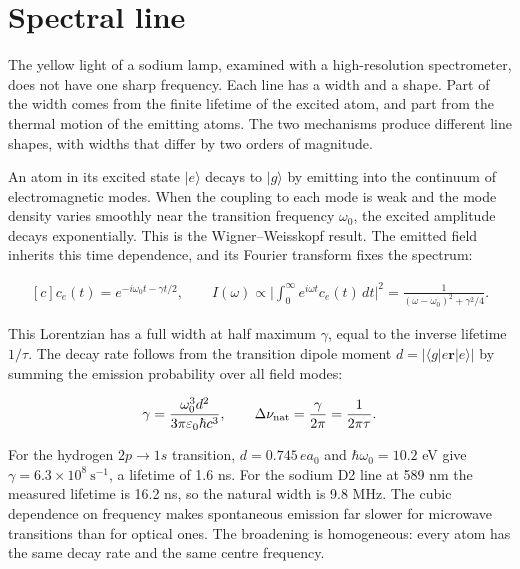 \documentclass[11pt,oneside]{book}
\newenvironment{centeredalign}{\[\begin{gathered}[c]}{\end{gathered}\]}
\newcommand{\ket}[1]{\lvert #1\rangle}
\begin{document}
\clearpage

\section{Spectral line}

\label{topic:spectral-line}

The yellow light of a sodium lamp, examined with a high-resolution spectrometer, does not have one sharp frequency. Each line has a width and a shape. Part of the width comes from the finite lifetime of the excited atom, and part from the thermal motion of the emitting atoms. The two mechanisms produce different line shapes, with widths that differ by two orders of magnitude.

An atom in its excited state \(\ket e\) decays to \(\ket g\) by emitting into the continuum of electromagnetic modes. When the coupling to each mode is weak and the mode density varies smoothly near the transition frequency \(\omega_0\), the excited amplitude decays exponentially. This is the Wigner--Weisskopf result. The emitted field inherits this time dependence, and its Fourier transform fixes the spectrum:

\begin{centeredalign}
c_e(t)=e^{-i\omega_0t-\gamma t/2},\qquad
I(\omega)\propto\Big|\int_0^\infty e^{i\omega t}c_e(t)\,dt\Big|^2=\frac{1}{(\omega-\omega_0)^2+\gamma^2/4}.
\end{centeredalign}

This Lorentzian has a full width at half maximum \(\gamma\), equal to the inverse lifetime \(1/\tau\). The decay rate follows from the transition dipole moment \(d=|\langle g|e\mathbf r|e\rangle|\) by summing the emission probability over all field modes:

\begin{centeredalign}
\gamma=\frac{\omega_0^3d^2}{3\pi\varepsilon_0\hbar c^3},\qquad
\Delta\nu_{\rm nat}=\frac{\gamma}{2\pi}=\frac{1}{2\pi\tau}.
\end{centeredalign}

For the hydrogen \(2p\to1s\) transition, \(d=0.745\,ea_0\) and \(\hbar\omega_0=10.2\) eV give \(\gamma=6.3\times10^8\ \mathrm{s}^{-1}\), a lifetime of 1.6 ns. For the sodium D2 line at 589 nm the measured lifetime is 16.2 ns, so the natural width is 9.8 MHz. The cubic dependence on frequency makes spontaneous emission far slower for microwave transitions than for optical ones. The broadening is homogeneous: every atom has the same decay rate and the same centre frequency.
\end{document}

